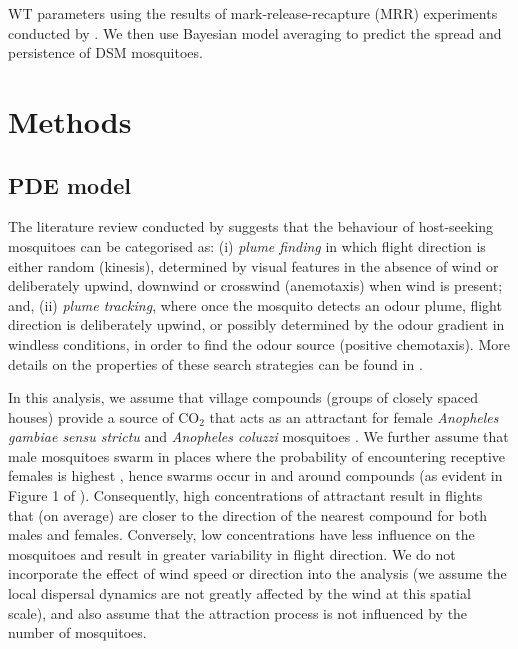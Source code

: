 \documentclass[]{bmcart}
\providecommand{\DIFaddend}{} %
\DeclareRobustCommand{\DIFaddend}{\DIFOaddend \let\includegraphics\DIFOincludegraphics} %
\begin{document}
\DIFaddend WT parameters using the results of mark-release-recapture (MRR) experiments conducted by \cite{Epopa2017}. We then use Bayesian model averaging to predict the spread and persistence of DSM mosquitoes. 

\section{Methods}

\subsection{PDE model}

The literature review conducted by \cite{Cummins2012} suggests that the behaviour of host-seeking mosquitoes can be categorised as: (i) \emph{plume finding} in which flight direction is either random (kinesis), determined by visual features in the absence of wind or deliberately upwind, downwind or crosswind (anemotaxis) when wind is present; and, (ii) \emph{plume tracking}, where once the mosquito detects an odour plume, flight direction is deliberately upwind, or possibly determined by the odour gradient in windless conditions, in order to find the odour source (positive chemotaxis). More details on the properties of these search strategies can be found in \cite{Pasternak2009}. 

In this analysis, we assume that village compounds (groups of closely spaced houses) provide a source of CO$_2$ that acts as an attractant for female \emph{Anopheles gambiae sensu strictu} and \emph{Anopheles coluzzi} mosquitoes \cite{DeJong1995, Majeed2017}. We further assume that male mosquitoes swarm in places where the probability of encountering receptive females is highest \citep{Diabate2015}, hence swarms occur in and around compounds (as evident in Figure 1 of \citep[][]{Epopa2017}). Consequently, high concentrations of attractant result in flights that (on average) are closer to the direction of the nearest compound for both males and females. Conversely, low concentrations have less influence on the mosquitoes and result in greater variability in flight direction. We do not incorporate the effect of wind speed or direction into the analysis (we assume the local dispersal dynamics are not greatly affected by the wind at this spatial scale), and also assume that the attraction process is not influenced by the number of mosquitoes.
\end{document}
